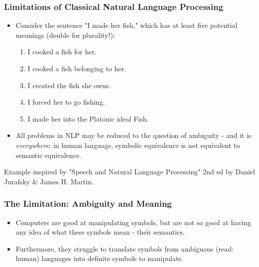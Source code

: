 \documentclass{beamer}
\begin{document}
\begin{frame}
\frametitle{Limitations of Classical Natural Language Processing}

\begin{itemize}
\item Consider the sentence "I made her fish," which has at least five potential
meanings (double for plurality!):

\begin{enumerate}
  \item I cooked a fish for her.
  \item I cooked a fish belonging to her.
  \item I created the fish she owns.
  \item I forced her to go fishing.
  \item I made her into the Platonic ideal Fish.
\end{enumerate}

\item All problems in NLP may be reduced to the question of ambiguity - and it is
\emph{everywhere}; in human language, symbolic equivalence is not equivalent to semantic equivalence.

\end{itemize}
\begin{minipage}[t][.2\textheight]{\textwidth}
\tiny{Example inspired by "Speech and Natural Language
Processing" 2nd ed by Daniel
Jurafsky \& James H. Martin.}
\vfill
\end{minipage}
\end{frame}

\begin{frame}
\frametitle{The Limitation: Ambiguity and Meaning}

\begin{itemize}
  \item Computers are good at manipulating symbols, but are not so good at
  having any idea of what these symbols mean - their semantics.
  \item Furthermore, they struggle to translate symbols from ambiguous (read:
  human) languages into definite symbols to manipulate.
\end{itemize}
\end{frame}
\end{document}
